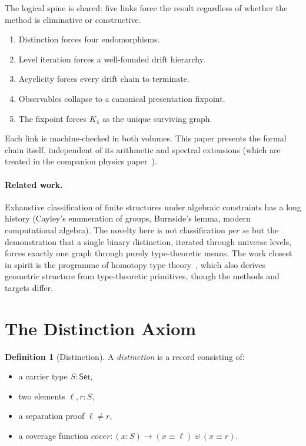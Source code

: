 \documentclass[11pt,a4paper]{article}
\theoremstyle{definition}
\newtheorem{definition}[theorem]{Definition}
\begin{document}
The logical spine is shared: five links force the result regardless of
whether the method is eliminative or constructive.

\begin{enumerate}[nosep]
  \item Distinction forces four endomorphisms.
  \item Level iteration forces a well-founded drift hierarchy.
  \item Acyclicity forces every drift chain to terminate.
  \item Observables collapse to a canonical presentation fixpoint.
  \item The fixpoint forces $K_4$ as the unique surviving graph.
\end{enumerate}

Each link is machine-checked in both volumes.  This paper presents the
formal chain itself, independent of its arithmetic and spectral extensions
(which are treated in the companion physics paper~\cite{wielsch2026physics}).

\paragraph{Related work.}
Exhaustive classification of finite structures under algebraic constraints
has a long history (Cayley's enumeration of groups, Burnside's lemma,
modern computational algebra).  The novelty here is not classification
\emph{per se} but the demonstration that a single binary distinction,
iterated through universe levels, forces exactly one graph through purely
type-theoretic means.  The work closest in spirit is the programme of
homotopy type theory~\cite{hottbook}, which also derives geometric
structure from type-theoretic primitives, though the methods and targets differ.

\section{The Distinction Axiom}
\label{sec:distinction}

\begin{definition}[Distinction]
A \emph{distinction} is a record consisting of:
\begin{itemize}[nosep]
  \item a carrier type $S : \mathsf{Set}$,
  \item two elements $\ell, r : S$,
  \item a separation proof $\ell \neq r$,
  \item a coverage function $\mathit{cover} : (x : S) \to (x \equiv \ell) \uplus (x \equiv r)$.
\end{itemize}
\end{definition}
\end{document}
